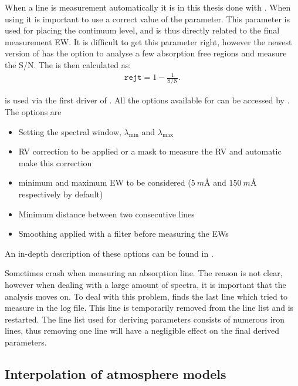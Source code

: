 When a line is measurement automatically it is in this thesis done with 
\citep{Sousa2007,Sousa2015a}. When using  it is important to use a correct value of the
 parameter. This parameter is used for placing the continuum level, and is thus directly
related to the final measurement EW. It is difficult to get this parameter right, however the newest
version of  has the option to analyse a few absorption free regions and measure the S/N.
The  is then calculated as:
\begin{align*}
  \mathtt{rejt} = 1 - \frac{1}{\mathrm{S/N}}.
\end{align*}

 is used via the first driver of . All the options available for 
can be accessed by . The options are
\begin{itemize}
  \item Setting the spectral window, $\lambda_\mathrm{min}$ and $\lambda_\mathrm{max}$
  \item RV correction to be applied or a mask to measure the RV and automatic make this correction
  \item minimum and maximum EW to be considered ($\SI{5}{m\angstrom}$ and $\SI{150}{m\angstrom}$
        respectively by default)
  \item Minimum distance between two consecutive lines
  \item Smoothing applied with a  filter before measuring the EWs
\end{itemize}
An in-depth description of these options can be found in
\citet{Sousa2007,Sousa2015a}.

Sometimes  crash when measuring an absorption line. The reason is not clear, however when
dealing with a large amount of spectra, it is important that the analysis moves on. To deal with
this problem,  finds the last line which  tried to measure in the log file. This line is
temporarily removed from the line list and  is restarted. The line list used for deriving
parameters consists of numerous iron lines, thus removing one line will have a negligible effect on
the final derived parameters.



\subsection{Interpolation of atmosphere models}
\label{sec:interpolation}

